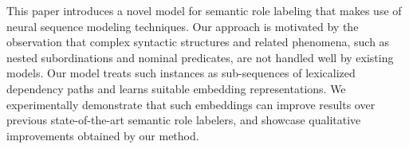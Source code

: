 This paper introduces a novel model for semantic role labeling that makes use of neural sequence modeling techniques. Our approach is motivated by the observation that complex syntactic structures and related phenomena, such as nested subordinations and nominal predicates, are not handled well by existing models. Our model treats such instances as sub-sequences of lexicalized dependency paths and learns suitable embedding representations. We experimentally demonstrate that such embeddings can improve results over previous state-of-the-art semantic role labelers, and showcase qualitative improvements obtained by our method.
